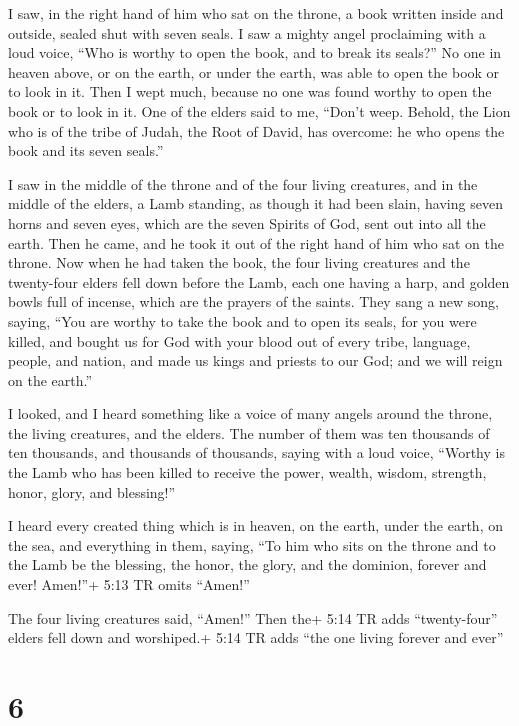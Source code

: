  I saw, in the right hand of him who sat on the throne, a
book written inside and outside, sealed shut with seven seals.
 I saw a mighty angel proclaiming with a loud voice, ``Who
is worthy to open the book, and to break its seals?''  No
one in heaven above, or on the earth, or under the earth, was able to
open the book or to look in it.  Then I wept much, because
no one was found worthy to open the book or to look in it. 
One of the elders said to me, ``Don't weep. Behold, the Lion who is of
the tribe of Judah, the Root of David, has overcome: he who opens the
book and its seven seals.''

 I saw in the middle of the throne and of the four living
creatures, and in the middle of the elders, a Lamb standing, as though
it had been slain, having seven horns and seven eyes, which are the
seven Spirits of God, sent out into all the earth.  Then he
came, and he took it out of the right hand of him who sat on the throne.
 Now when he had taken the book, the four living creatures
and the twenty-four elders fell down before the Lamb, each one having a
harp, and golden bowls full of incense, which are the prayers of the
saints.  They sang a new song, saying, ``You are worthy to
take the book and to open its seals, for you were killed, and bought us
for God with your blood out of every tribe, language, people, and
nation,  and made us kings and priests to our God; and we
will reign on the earth.''

 I looked, and I heard something like a voice of many
angels around the throne, the living creatures, and the elders. The
number of them was ten thousands of ten thousands, and thousands of
thousands,  saying with a loud voice, ``Worthy is the Lamb
who has been killed to receive the power, wealth, wisdom, strength,
honor, glory, and blessing!''

 I heard every created thing which is in heaven, on the
earth, under the earth, on the sea, and everything in them, saying, ``To
him who sits on the throne and to the Lamb be the blessing, the honor,
the glory, and the dominion, forever and ever! Amen!''+ 5:13 TR omits
``Amen!''

 The four living creatures said, ``Amen!'' Then the+ 5:14
TR adds ``twenty-four'' elders fell down and worshiped.+ 5:14 TR adds
``the one living forever and ever''

\hypertarget{section-5}{%
\section{6}\label{section-5}}

